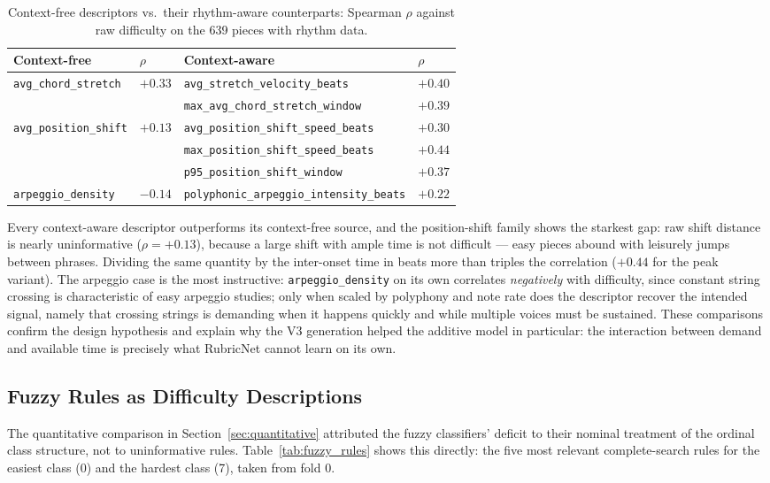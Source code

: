 \begin{table}[htbp]
\centering
\caption{Context-free descriptors vs.\ their rhythm-aware counterparts: Spearman $\rho$ against raw difficulty on the 639 pieces with rhythm data.}
\label{tab:proxy_comparison}
\begin{tabular}{llll}
\toprule
\textbf{Context-free} & $\rho$ & \textbf{Context-aware} & $\rho$ \\
\midrule
\texttt{avg\_chord\_stretch} & $+0.33$ & \texttt{avg\_stretch\_velocity\_beats} & $+0.40$ \\
 & & \texttt{max\_avg\_chord\_stretch\_window} & $+0.39$ \\
\midrule
\texttt{avg\_position\_shift} & $+0.13$ & \texttt{avg\_position\_shift\_speed\_beats} & $+0.30$ \\
 & & \texttt{max\_position\_shift\_speed\_beats} & $+0.44$ \\
 & & \texttt{p95\_position\_shift\_window} & $+0.37$ \\
\midrule
\texttt{arpeggio\_density} & $-0.14$ & \texttt{polyphonic\_arpeggio\_intensity\_beats} & $+0.22$ \\
\bottomrule
\end{tabular}
\end{table}

Every context-aware descriptor outperforms its context-free source, and the position-shift family shows the starkest gap: raw shift distance is nearly uninformative ($\rho = +0.13$), because a large shift with ample time is not difficult --- easy pieces abound with leisurely jumps between phrases. Dividing the same quantity by the inter-onset time in beats more than triples the correlation ($+0.44$ for the peak variant). The arpeggio case is the most instructive: \texttt{arpeggio\_density} on its own correlates \emph{negatively} with difficulty, since constant string crossing is characteristic of easy arpeggio studies; only when scaled by polyphony and note rate does the descriptor recover the intended signal, namely that crossing strings is demanding when it happens quickly and while multiple voices must be sustained. These comparisons confirm the design hypothesis and explain why the V3 generation helped the additive model in particular: the interaction between demand and available time is precisely what RubricNet cannot learn on its own.

\subsection{Fuzzy Rules as Difficulty Descriptions}
\label{sec:fuzzy_qualitative}
The quantitative comparison in Section~\ref{sec:quantitative} attributed the fuzzy classifiers' deficit to their nominal treatment of the ordinal class structure, not to uninformative rules. Table~\ref{tab:fuzzy_rules} shows this directly: the five most relevant complete-search rules for the easiest class (0) and the hardest class (7), taken from fold 0.

